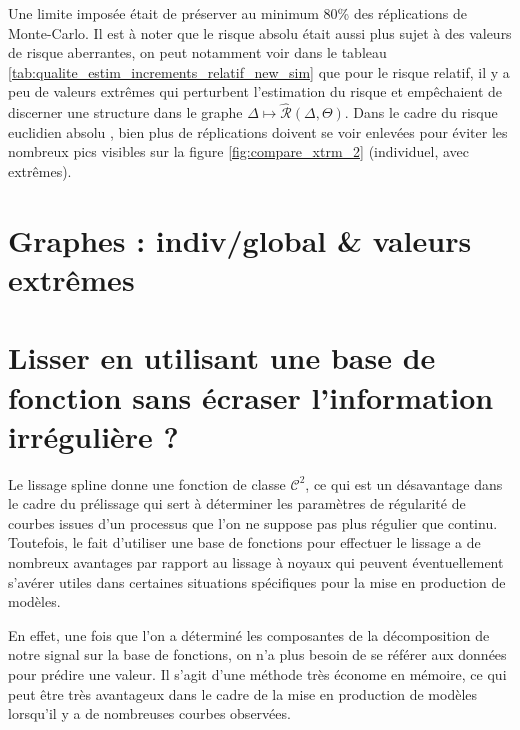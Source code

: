 \smallskip

Une limite imposée était de préserver au minimum 80\% des réplications de Monte-Carlo. Il est à noter que le risque absolu était aussi plus sujet à des valeurs de risque aberrantes, on peut notamment voir dans le tableau \ref{tab:qualite_estim_increments_relatif_new_sim} que pour le risque relatif, il y a peu de valeurs extrêmes qui perturbent l'estimation du risque et empêchaient de discerner une structure dans le graphe $\Delta \mapsto \widehat{\mathcal R}( \Delta, \Theta )$. Dans le cadre du risque euclidien \og absolu \fg, bien plus de réplications doivent se voir enlevées pour éviter les nombreux pics visibles sur la figure \ref{fig:compare_xtrm_2} (individuel, avec extrêmes).

\section{Graphes : indiv/global \& valeurs extrêmes}
\pagebreak




% 
\section{Lisser en utilisant une base de fonction sans écraser l'information irrégulière ?}
\label{annexe:lissage_base_fcn}

Le lissage spline donne une fonction de classe $\mathcal C^2$, ce qui est un désavantage dans le cadre du prélissage qui sert à déterminer les paramètres de régularité de courbes issues d'un processus que l'on ne suppose pas plus régulier que continu. Toutefois, le fait d'utiliser une base de fonctions pour effectuer le lissage a de nombreux avantages par rapport au lissage à noyaux qui peuvent éventuellement s'avérer utiles dans certaines situations spécifiques pour la mise en production de modèles.

En effet, une fois que l'on a déterminé les composantes de la décomposition de notre signal sur la base de fonctions, on n'a plus besoin de se référer aux données pour prédire une valeur. Il s'agit d'une méthode très économe en mémoire, ce qui peut être très avantageux dans le cadre de la mise en production de modèles lorsqu'il y a de nombreuses courbes observées.



